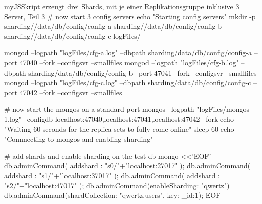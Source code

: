 \begin{listingsboxJavaScript}[label={lst:initReplica}]{myJS}{Skript erzeugt drei Shards, mit je einer Replikationsgruppe inklusive 3 Server, Teil 3}
# now start 3 config servers
echo "Starting config servers"
mkdir -p sharding//data/db/config/config-a sharding//data/db/config/config-b 
sharding//data/db/config/config-c logFiles/

mongod --logpath "logFiles/cfg-a.log" --dbpath sharding/data/db/config/config-a
 --port 47040 --fork --configsvr --smallfiles
mongod --logpath "logFiles/cfg-b.log" --dbpath sharding/data/db/config/config-b 
--port 47041 --fork --configsvr --smallfiles
mongod --logpath "logFiles/cfg-c.log" --dbpath sharding/data/db/config/config-c 
--port 47042 --fork --configsvr --smallfiles

# now start the mongos on a standard port
mongos --logpath "logFiles/mongos-1.log" 
--configdb localhost:47040,localhost:47041,localhost:47042 --fork
echo "Waiting 60 seconds for the replica sets to fully come online"
sleep 60
echo "Connnecting to mongos and enabling sharding"

# add shards and enable sharding on the test db
mongo <<'EOF'
db.adminCommand( { addshard : "s0/"+"localhost:27017" } );
db.adminCommand( { addshard : "s1/"+"localhost:37017" } );
db.adminCommand( { addshard : "s2/"+"localhost:47017" } );
db.adminCommand({enableSharding: "qwertz"})
db.adminCommand({shardCollection: "qwertz.users", key: {_id:1}});
EOF
\end{listingsboxJavaScript}


